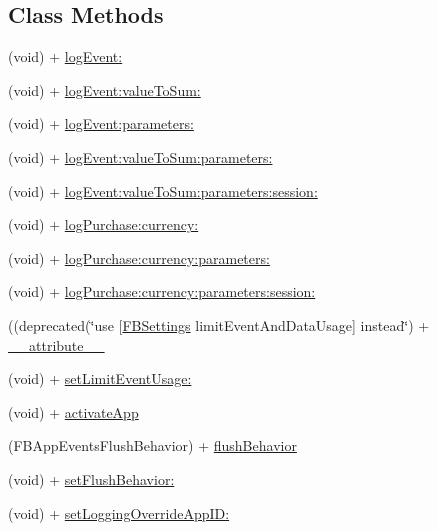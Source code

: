 \subsection*{Class Methods}
\begin{DoxyCompactItemize}
\item 
(void) + \hyperlink{interfaceFBAppEvents_a816373dd50bcf7381bf8194758ef8441}{log\+Event\+:}
\item 
(void) + \hyperlink{interfaceFBAppEvents_a9ac18622973fab340ecf25c63c933a34}{log\+Event\+:value\+To\+Sum\+:}
\item 
(void) + \hyperlink{interfaceFBAppEvents_a68b55bf0f5695fdf0089326473fcf4ea}{log\+Event\+:parameters\+:}
\item 
(void) + \hyperlink{interfaceFBAppEvents_a97a4a0a626b52abef16bdb3ea046b89e}{log\+Event\+:value\+To\+Sum\+:parameters\+:}
\item 
(void) + \hyperlink{interfaceFBAppEvents_a53a76d8d2b1245932bc89d55cdd247fa}{log\+Event\+:value\+To\+Sum\+:parameters\+:session\+:}
\item 
(void) + \hyperlink{interfaceFBAppEvents_a871b481d919104f7dbb67247b682e0fa}{log\+Purchase\+:currency\+:}
\item 
(void) + \hyperlink{interfaceFBAppEvents_aa77be4e60be97432ca9f6e3afe8d7b7f}{log\+Purchase\+:currency\+:parameters\+:}
\item 
(void) + \hyperlink{interfaceFBAppEvents_a96a5a1507cf439301bf5330339999777}{log\+Purchase\+:currency\+:parameters\+:session\+:}
\item 
((deprecated(\char`\"{}use \mbox{[}\hyperlink{interfaceFBSettings}{F\+B\+Settings} limit\+Event\+And\+Data\+Usage\mbox{]} instead\char`\"{}) + \hyperlink{interfaceFBAppEvents_a395c574fef6bbde5ac4b98b6cf497b8c}{\+\_\+\+\_\+attribute\+\_\+\+\_\+}
\item 
(void) + \hyperlink{interfaceFBAppEvents_a35ba571c101d4c2a051583f59ad433ab}{set\+Limit\+Event\+Usage\+:}
\item 
(void) + \hyperlink{interfaceFBAppEvents_a440fe60c1685ab36053ba18a190dd82e}{activate\+App}
\item 
(F\+B\+App\+Events\+Flush\+Behavior) + \hyperlink{interfaceFBAppEvents_af9b7ac67d5b3587f7dc452ba2129fe85}{flush\+Behavior}
\item 
(void) + \hyperlink{interfaceFBAppEvents_a0c6f0d165c7fba6eab71ff3228e9b848}{set\+Flush\+Behavior\+:}
\item 
(void) + \hyperlink{interfaceFBAppEvents_a3f9d06a1e8b3d482efc5c438827fbc6e}{set\+Logging\+Override\+App\+I\+D\+:}
\item 

\end{DoxyCompactItemize}
